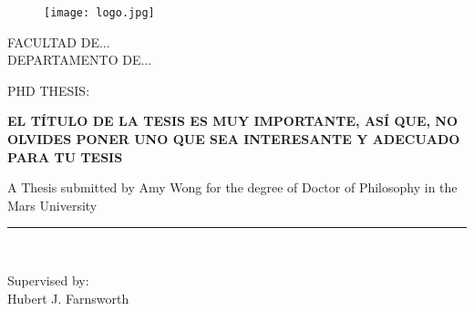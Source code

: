 \documentclass[a4paper,openright,12pt]{report}
\begin{document}
\begin{titlepage}

\begin{center}
\vspace*{-1in}
\begin{figure}[htb]
\begin{center}
\texttt{[image: logo.jpg]}
\end{center}
\end{figure}

FACULTAD DE...\\
\vspace*{0.15in}
DEPARTAMENTO DE... \\
\vspace*{0.6in}
\begin{large}
PHD THESIS:\\
\end{large}
\vspace*{0.2in}
\begin{Large}
\textbf{EL TÍTULO DE LA TESIS ES MUY IMPORTANTE, ASÍ QUE, NO OLVIDES PONER UNO QUE SEA INTERESANTE Y ADECUADO PARA TU TESIS} \\
\end{Large}
\vspace*{0.3in}
\begin{large}
A Thesis submitted by Amy Wong for the degree of Doctor of Philosophy in the Mars University\\
\end{large}
\vspace*{0.3in}
\rule{80mm}{0.1mm}\\
\vspace*{0.1in}
\begin{large}
Supervised by: \\
Hubert J. Farnsworth \\
\end{large}
\end{center}

\end{titlepage}
\end{document}
